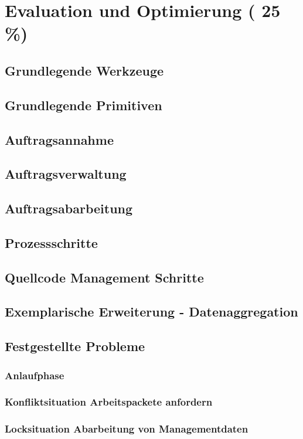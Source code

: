 \chapter{Evaluation und Optimierung ( 25 \%)}

\section{Grundlegende Werkzeuge}
\section{Grundlegende Primitiven}
\section{Auftragsannahme}
\section{Auftragsverwaltung}
\section{Auftragsabarbeitung}
\section{Prozessschritte}
\section{Quellcode Management Schritte}
\section{Exemplarische Erweiterung - Datenaggregation}

\section{Festgestellte Probleme}
\subsection{Anlaufphase}
\subsection{Konfliktsituation Arbeitspackete anfordern}
\subsection{Locksituation Abarbeitung von Managementdaten}

